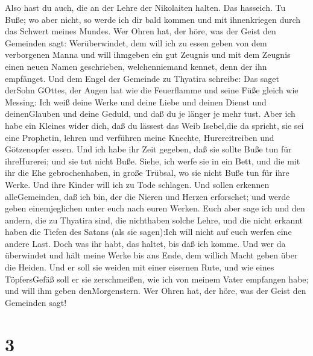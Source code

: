  Also hast du auch, die an der Lehre der Nikolaiten halten.
Das hasseich.  Tu Buße; wo aber nicht, so werde ich dir
bald kommen und mit ihnenkriegen durch das Schwert meines Mundes.
 Wer Ohren hat, der höre, was der Geist den Gemeinden sagt:
Werüberwindet, dem will ich zu essen geben von dem verborgenen Manna und
will ihmgeben ein gut Zeugnis und mit dem Zeugnis einen neuen Namen
geschrieben, welchenniemand kennet, denn der ihn empfänget.
 Und dem Engel der Gemeinde zu Thyatira schreibe: Das saget
derSohn GOttes, der Augen hat wie die Feuerflamme und seine Füße gleich
wie Messing:  Ich weiß deine Werke und deine Liebe und
deinen Dienst und deinenGlauben und deine Geduld, und daß du je länger
je mehr tust.  Aber ich habe ein Kleines wider dich, daß du
lässest das Weib Isebel,die da spricht, sie sei eine Prophetin, lehren
und verführen meine Knechte, Hurereitreiben und Götzenopfer essen.
 Und ich habe ihr Zeit gegeben, daß sie sollte Buße tun für
ihreHurerei; und sie tut nicht Buße.  Siehe, ich werfe sie
in ein Bett, und die mit ihr die Ehe gebrochenhaben, in große Trübsal,
wo sie nicht Buße tun für ihre Werke.  Und ihre Kinder will
ich zu Tode schlagen. Und sollen erkennen alleGemeinden, daß ich bin,
der die Nieren und Herzen erforschet; und werde geben einemjeglichen
unter euch nach euren Werken.  Euch aber sage ich und den
andern, die zu Thyatira sind, die nichthaben solche Lehre, und die nicht
erkannt haben die Tiefen des Satans (als sie sagen):Ich will nicht auf
euch werfen eine andere Last.  Doch was ihr habt, das
haltet, bis daß ich komme.  Und wer da überwindet und hält
meine Werke bis ans Ende, dem willich Macht geben über die Heiden.
 Und er soll sie weiden mit einer eisernen Rute, und wie
eines TöpfersGefäß soll er sie zerschmeißen,  wie ich von
meinem Vater empfangen habe; und will ihm geben denMorgenstern.
 Wer Ohren hat, der höre, was der Geist den Gemeinden sagt!

\hypertarget{section-1}{%
\section{3}\label{section-1}}

